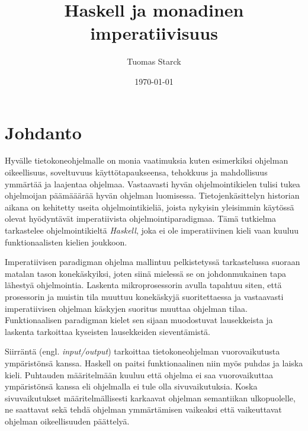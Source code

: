 \documentclass[finnish]{tktltiki2}
\title{Haskell ja monadinen imperatiivisuus}
\author{Tuomas Starck}
\date{\today}
\begin{document}
\frontmatter

\maketitle
\makeabstract

\tableofcontents

\mainmatter

\newcommand{\arr}[0]{\rightarrow}
\newcommand{\code}[1]{\texttt{#1}}
\newcommand{\fixme}[1]{\emph{#1}}


\section{Johdanto}


Hyvälle tietokoneohjelmalle on monia vaatimuksia kuten esimerkiksi ohjelman oikeellisuus,
soveltuvuus käyttötapaukseensa, tehokkuus ja mahdollisuus ymmärtää ja laajentaa ohjelmaa.
Vastaavasti hyvän ohjelmointikielen tulisi tukea ohjelmoijan päämääärää hyvän ohjelman luomisessa.
Tietojenkäsittelyn historian aikana on kehitetty useita ohjelmointikieliä, joista nykyisin
yleisimmin käytössä olevat hyödyntävät imperatiivista ohjelmointiparadigmaa. Tämä tutkielma
tarkastelee ohjelmointikieltä \emph{Haskell}, joka ei ole imperatiivinen kieli vaan kuuluu
funktionaalisten kielien joukkoon.

Imperatiivisen paradigman ohjelma mallintuu pelkistetyssä tarkastelussa suoraan matalan tason
konekäskyiksi, joten siinä mielessä se on johdonmukainen tapa lähestyä ohjelmointia. Laskenta
mikroprosessorin avulla tapahtuu siten, että prosessorin ja muistin tila muuttuu konekäskyjä
suoritettaessa ja vastaavasti imperatiivisen ohjelman käskyjen suoritus muuttaa ohjelman tilaa.
Funktionaalisen paradigman kielet sen sijaan muodostuvat lausekkeista ja laskenta tarkoittaa
kyseisten lausekkeiden sieventämistä.

Siirräntä (engl. \emph{input/output}) tarkoittaa tietokoneohjelman vuorovaikutusta ympäristönsä
kanssa. Haskell on paitsi funktionaalinen niin myös puhdas ja laiska kieli. Puhtauden määritelmään
kuuluu että ohjelma ei saa vuorovaikuttaa ympäristönsä kanssa eli ohjelmalla ei tule olla
sivuvaikutuksia. Koska sivuvaikutukset määritelmällisesti karkaavat ohjelman semantiikan
ulkopuolelle, ne saattavat sekä tehdä ohjelman ymmärtämisen vaikeaksi että vaikeuttavat ohjelman
oikeellisuuden päättelyä.
\end{document}
